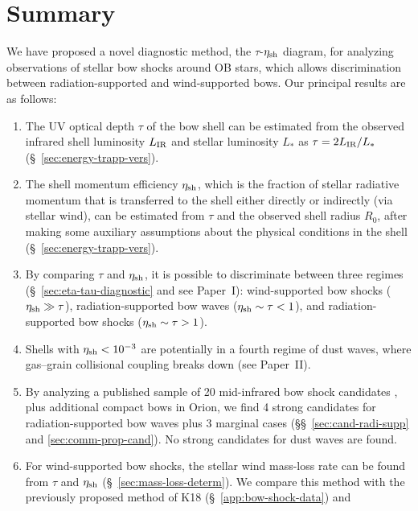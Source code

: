 \documentclass[useAMS, usenatbib, a4paper]{mnras}
\begin{document}




\section{Summary}
\label{sec:conclusions}

We have proposed a novel diagnostic method, the \(\tau\)-\(\eta_{\text{sh}}\)
diagram, for analyzing observations of stellar bow shocks around OB
stars, which allows discrimination between radiation-supported and
wind-supported bows.  Our principal results are as follows:
\begin{enumerate}[1.]
\item The UV optical depth \(\tau\) of the bow shell can be estimated
  from the observed infrared shell luminosity \(L_{\text{IR}}\) and stellar
  luminosity \(L_*\) as \(\tau = 2 L_{\text{IR}}/L_*\)
  (\S~\ref{sec:energy-trapp-vers}).
\item The shell momentum efficiency \(\eta_{\text{sh}}\), which is the
  fraction of stellar radiative momentum that is transferred to the
  shell either directly or indirectly (via stellar wind), can be
  estimated from \(\tau\) and the observed shell radius \(R_0\), after
  making some auxiliary assumptions about the physical conditions in
  the shell (\S~\ref{sec:energy-trapp-vers}).
\item By comparing \(\tau\) and \(\eta_{\text{sh}}\), it is possible to
  discriminate between three regimes (\S~\ref{sec:eta-tau-diagnostic}
  and see Paper~I): wind-supported bow shocks
  (\(\eta_{\text{sh}} \gg \tau\)), radiation-supported bow waves
  (\(\eta_{\text{sh}} \sim \tau < 1\)), and radiation-supported bow shocks
  (\(\eta_{\text{sh}} \sim \tau > 1\)).
\item Shells with \(\eta_{\text{sh}} < \num{e-3}\) are potentially in a
  fourth regime of dust waves, where gas--grain collisional coupling
  breaks down (see Paper~II).
\item By analyzing a published sample of 20 mid-infrared bow shock
  candidates \citep[K18]{Kobulnicky:2018a}, plus additional compact
  bows in Orion, we find 4 strong candidates for radiation-supported
  bow waves plus 3 marginal cases (\S\S~\ref{sec:cand-radi-supp} and
  \ref{sec:comm-prop-cand}).  No strong candidates for dust waves are
  found.
\item For wind-supported bow shocks, the stellar wind mass-loss rate
  can be found from \(\tau\) and \(\eta_{\text{sh}}\)
  (\S~\ref{sec:mass-loss-determ}). We compare this method with the
  previously proposed method of K18 (\S~\ref{app:bow-shock-data}) and

\end{enumerate}
\end{document}
